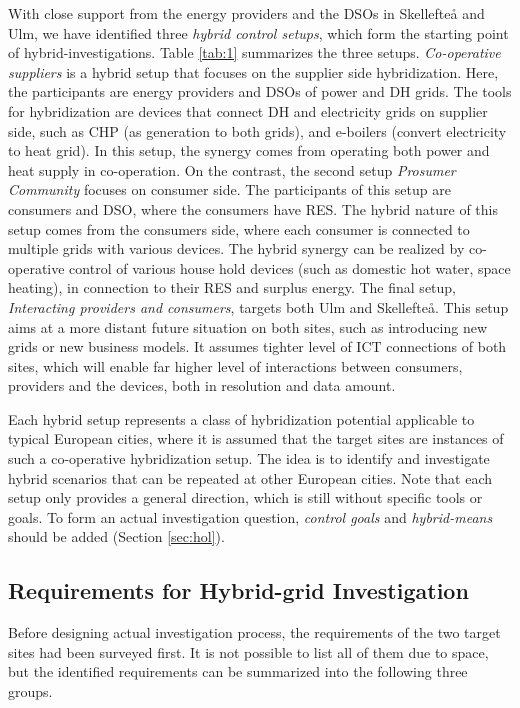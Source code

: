\documentclass[review]{elsarticle}
\begin{document}
With close support from the energy providers and the DSOs 
in Skellefte{\aa} and Ulm, we have identified three {\em hybrid
  control setups}, which form the starting point of
hybrid-investigations.    
Table \ref{tab:1} summarizes the three setups. {\em Co-operative
  suppliers} is a hybrid setup that focuses on the supplier side
hybridization. Here, the participants are energy providers and DSOs of  
power and DH grids. The tools for hybridization are devices that
connect DH and electricity grids on supplier side,
such as CHP (as generation to both grids), and e-boilers (convert
electricity to heat grid). In this setup, the synergy comes from
operating both power and heat supply in co-operation. 
On the contrast, the second setup {\em Prosumer Community} focuses on
consumer side. The participants of this setup are consumers and DSO,
where the consumers have RES. The hybrid nature of this setup comes
from the consumers side, where each consumer is connected to multiple
grids with various devices. The hybrid synergy can be realized by
co-operative control of various house hold devices (such as domestic
hot water, space heating), in connection to their RES and surplus
energy. 
The final setup, {\em Interacting providers and consumers}, targets
both Ulm and Skellefte{\aa}. This setup aims at a more distant future
situation on both sites, such as introducing new grids or new business
models. It assumes tighter level of ICT connections of both sites,
which will enable far higher level of interactions between consumers,
providers and the devices, both in resolution and data amount.   

Each hybrid setup represents a class of hybridization potential
applicable to typical European cities, where it is assumed that the
target sites are instances of such a co-operative hybridization setup. 
The idea is to identify and investigate hybrid scenarios that can be
repeated at other European cities. Note that each setup only provides
a general direction, which is still without specific tools or
goals. To form an actual investigation question,  {\em control
  goals} and {\em hybrid-means} should be added (Section
\ref{sec:hol}). 

\subsection{Requirements for Hybrid-grid Investigation}
\label{sec:req-2}
Before designing actual investigation process, the requirements of the
two target sites had been surveyed first. 
It is not possible to list all of them due to space, but the
identified requirements can be summarized into the following three
groups.  
\end{document}
